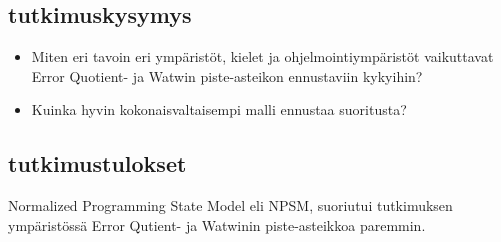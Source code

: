 \documentclass[finnish,twoside,openright]{HYgraduMLDS}
\begin{document}
\subsection{tutkimuskysymys}

\begin{itemize}
    \item Miten eri tavoin eri ympäristöt, kielet ja ohjelmointiympäristöt vaikuttavat Error Quotient\cite{jadud2006methods}- ja Watwin\cite{watson2014no} piste-asteikon ennustaviin kykyihin?
    \item Kuinka hyvin kokonaisvaltaisempi malli ennustaa suoritusta?
\end{itemize}


\subsection{tutkimustulokset}

Normalized Programming State Model eli NPSM, suoriutui tutkimuksen\cite{carter2015normalized} ympäristössä Error Qutient- ja Watwinin piste-asteikkoa paremmin.
\end{document}
